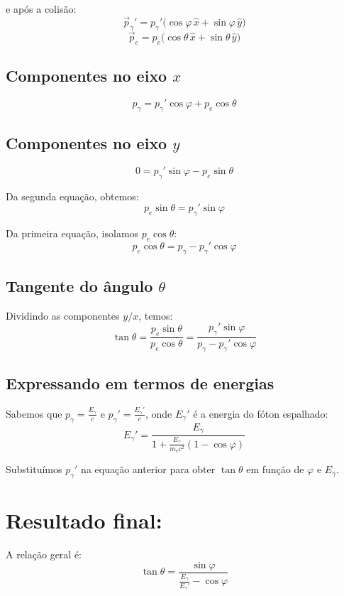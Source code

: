 \begin{flushleft}
e após a colisão:
\[
\vec{p}_\gamma' = p_\gamma' \bigl( \cos\varphi\,\hat{x} + \sin\varphi\,\hat{y} \bigr)
\]
\[
\vec{p}_e = p_e \bigl( \cos\theta\,\hat{x} + \sin\theta\,\hat{y} \bigr)
\]

\subsection*{Componentes no eixo \(x\)}

\[
p_\gamma = p_\gamma' \cos\varphi + p_e \cos\theta
\]

\subsection*{Componentes no eixo \(y\)}

\[
0 = p_\gamma' \sin\varphi - p_e \sin\theta
\]

Da segunda equação, obtemos:
\[
p_e \sin\theta = p_\gamma' \sin\varphi
\]

Da primeira equação, isolamos \( p_e \cos\theta \):
\[
p_e \cos\theta = p_\gamma - p_\gamma' \cos\varphi
\]

\subsection*{Tangente do ângulo \( \theta \)}

Dividindo as componentes \(y/x\), temos:
\[
\tan\theta = \frac{p_e \sin\theta}{p_e \cos\theta} =
\frac{p_\gamma' \sin\varphi}{p_\gamma - p_\gamma' \cos\varphi}
\]

\subsection*{Expressando em termos de energias}

Sabemos que \( p_\gamma = \frac{E_\gamma}{c} \) e \( p_\gamma' = \frac{E_\gamma'}{c} \), onde \( E_\gamma' \) é a energia do fóton espalhado:
\[
E_\gamma' = \frac{E_\gamma}{1 + \frac{E_\gamma}{m_e c^2}(1 - \cos\varphi)}
\]

Substituímos \( p_\gamma' \) na equação anterior para obter \( \tan\theta \) em função de \( \varphi \) e \( E_\gamma \).

\section*{Resultado final:}

A relação geral é:
\[
\tan\theta =
\frac{\sin\varphi}{\displaystyle \frac{E_\gamma}{E_\gamma'} - \cos\varphi}
\]


\end{flushleft}

